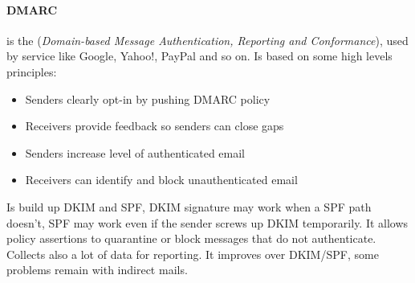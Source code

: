\documentclass[12pt]{article}
\begin{document}
\paragraph{DMARC} is the (\textit{Domain-based Message Authentication, Reporting and Conformance}), used by service like Google, Yahoo!, PayPal and so on. Is based on some high levels principles:
\begin{itemize}
  \item Senders clearly opt-in by pushing DMARC policy
  \item Receivers provide feedback so senders can close gaps
  \item Senders increase level of authenticated email
  \item Receivers can identify and block unauthenticated email
\end{itemize}
Is build up DKIM and SPF, DKIM signature may work when a SPF path doesn't, SPF may work even if the sender screws up DKIM temporarily.
It allows policy assertions to quarantine or block messages that do not authenticate. Collects also a lot of data for reporting. It improves over DKIM/SPF, some problems remain with indirect mails.
\end{document}
